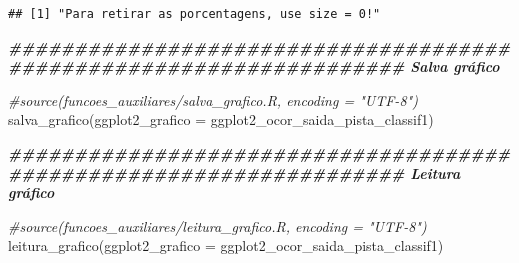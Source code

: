 \documentclass[
]{article}
\newenvironment{Shaded}{\begin{snugshade}}{\end{snugshade}}
\newcommand{\AttributeTok}[1]{\textcolor[rgb]{0.77,0.63,0.00}{#1}}
\newcommand{\CommentTok}[1]{\textcolor[rgb]{0.56,0.35,0.01}{\textit{#1}}}
\newcommand{\ConstantTok}[1]{\textcolor[rgb]{0.00,0.00,0.00}{#1}}
\newcommand{\DecValTok}[1]{\textcolor[rgb]{0.00,0.00,0.81}{#1}}
\newcommand{\DocumentationTok}[1]{\textcolor[rgb]{0.56,0.35,0.01}{\textbf{\textit{#1}}}}
\newcommand{\FloatTok}[1]{\textcolor[rgb]{0.00,0.00,0.81}{#1}}
\newcommand{\FunctionTok}[1]{\textcolor[rgb]{0.00,0.00,0.00}{#1}}
\newcommand{\NormalTok}[1]{#1}
\newcommand{\OtherTok}[1]{\textcolor[rgb]{0.56,0.35,0.01}{#1}}
\newcommand{\SpecialCharTok}[1]{\textcolor[rgb]{0.00,0.00,0.00}{#1}}
\newcommand{\StringTok}[1]{\textcolor[rgb]{0.31,0.60,0.02}{#1}}
\begin{document}
\begin{Shaded}
\end{Shaded}

\begin{verbatim}
## [1] "Para retirar as porcentagens, use size = 0!"
\end{verbatim}

\begin{Shaded}
\begin{Highlighting}[]
\DocumentationTok{\#\#\#\#\#\#\#\#\#\#\#\#\#\#\#\#\#\#\#\#\#\#\#\#\#\#\#\#\#\#\#\#\#\#\#\#\#\#\#\#\#\#\#\#\#\#\#\#\#\#\#\#\#\#\#\#\#\#\#\#\#\#\#\#\#\#\#\# Salva gráfico}

\CommentTok{\#source(\textquotesingle{}funcoes\_auxiliares/salva\_grafico.R\textquotesingle{}, encoding = "UTF{-}8")}
\FunctionTok{salva\_grafico}\NormalTok{(}\AttributeTok{ggplot2\_grafico =}\NormalTok{ ggplot2\_ocor\_saida\_pista\_classif1)}

\DocumentationTok{\#\#\#\#\#\#\#\#\#\#\#\#\#\#\#\#\#\#\#\#\#\#\#\#\#\#\#\#\#\#\#\#\#\#\#\#\#\#\#\#\#\#\#\#\#\#\#\#\#\#\#\#\#\#\#\#\#\#\#\#\#\#\#\#\#\#\#\# Leitura gráfico}

\CommentTok{\#source(\textquotesingle{}funcoes\_auxiliares/leitura\_grafico.R\textquotesingle{}, encoding = "UTF{-}8")}
\FunctionTok{leitura\_grafico}\NormalTok{(}\AttributeTok{ggplot2\_grafico =}\NormalTok{ ggplot2\_ocor\_saida\_pista\_classif1)}
\end{Highlighting}
\end{Shaded}
\end{document}
